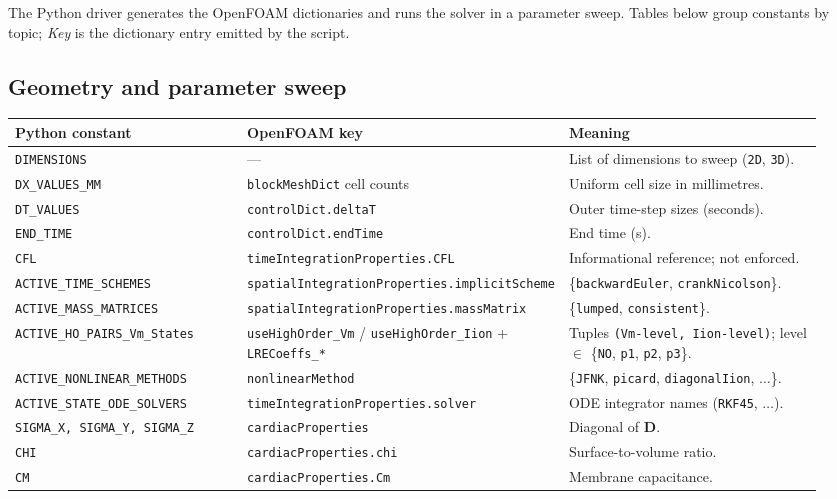 \documentclass[11pt,a4paper]{article}
\newcommand{\Dten}{\mathbf{D}}
\newcommand{\code}[1]{\texttt{\small #1}}
\begin{document}
The Python driver generates the OpenFOAM dictionaries and runs the
solver in a parameter sweep. Tables below group constants by topic;
\emph{Key} is the dictionary entry emitted by the script.

\subsection{Geometry and parameter sweep}
\begin{longtable}{@{}p{0.30\linewidth}p{0.28\linewidth}p{0.36\linewidth}@{}}
\toprule
Python constant & OpenFOAM key & Meaning \\
\midrule \endhead
\code{DIMENSIONS} & --- &
   List of dimensions to sweep (\code{2D}, \code{3D}). \\
\code{DX\_VALUES\_MM} & \code{blockMeshDict} cell counts &
   Uniform cell size in millimetres. \\
\code{DT\_VALUES} & \code{controlDict.deltaT} &
   Outer time-step sizes (seconds). \\
\code{END\_TIME} & \code{controlDict.endTime} & End time (s). \\
\code{CFL} & \code{timeIntegrationProperties.CFL} &
   Informational reference; not enforced. \\
\code{ACTIVE\_TIME\_SCHEMES} &
   \code{spatialIntegrationProperties.implicitScheme} &
   \{\code{backwardEuler}, \code{crankNicolson}\}. \\
\code{ACTIVE\_MASS\_MATRICES} &
   \code{spatialIntegrationProperties.massMatrix} &
   \{\code{lumped}, \code{consistent}\}. \\
\code{ACTIVE\_HO\_PAIRS\_Vm\_States} &
   \code{useHighOrder\_Vm} / \code{useHighOrder\_Iion}
   + \code{LRECoeffs\_*} &
   Tuples \texttt{(Vm-level, Iion-level)}; level $\in$
   \{\code{NO}, \code{p1}, \code{p2}, \code{p3}\}. \\
\code{ACTIVE\_NONLINEAR\_METHODS} &
   \code{nonlinearMethod} &
   \{\code{JFNK}, \code{picard}, \code{diagonalIion}, $\dots$\}. \\
\code{ACTIVE\_STATE\_ODE\_SOLVERS} &
   \code{timeIntegrationProperties.solver} &
   ODE integrator names (\code{RKF45}, $\dots$). \\
\code{SIGMA\_X, SIGMA\_Y, SIGMA\_Z} & \code{cardiacProperties} &
   Diagonal of $\Dten$. \\
\code{CHI} & \code{cardiacProperties.chi} & Surface-to-volume ratio. \\
\code{CM} & \code{cardiacProperties.Cm} & Membrane capacitance. \\
\bottomrule
\end{longtable}
\end{document}
